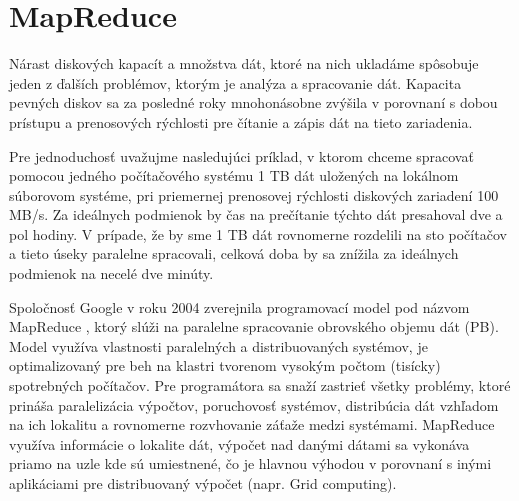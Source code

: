\documentclass[11pt,twoside,a4paper]{book}
\begin{document}

\section{MapReduce}

Nárast diskových kapacít a množstva dát, ktoré na nich ukladáme spôsobuje jeden z ďalších problémov, ktorým je analýza a spracovanie dát. Kapacita pevných diskov sa za posledné roky mnohonásobne zvýšila v porovnaní s dobou prístupu a prenosových rýchlosti pre čítanie a zápis dát na tieto zariadenia.

Pre jednoduchosť uvažujme nasledujúci príklad, v ktorom chceme spracovať pomocou jedného počítačového systému 1 TB dát uložených na lokálnom súborovom systéme, pri priemernej prenosovej rýchlosti diskových zariadení 100 MB/s. Za ideálnych podmienok by čas na prečítanie týchto dát presahoval dve a pol hodiny. V prípade, že by sme 1 TB dát rovnomerne rozdelili na sto počítačov a tieto úseky paralelne spracovali, celková doba by sa znížila za ideálnych podmienok na necelé dve minúty. 

Spoločnosť Google v roku 2004 zverejnila programovací model pod názvom MapReduce \cite{dean2008mapreduce}, ktorý slúži na paralelne spracovanie obrovského objemu dát (PB). Model využíva vlastnosti paralelných a distribuovaných systémov, je optimalizovaný pre beh na klastri tvorenom vysokým počtom (tisícky) spotrebných počítačov. Pre programátora sa snaží zastrieť všetky problémy, ktoré prináša paralelizácia výpočtov, poruchovosť systémov, distribúcia dát vzhľadom na ich lokalitu a rovnomerne rozvhovanie záťaže medzi systémami. MapReduce využíva informácie o lokalite dát, výpočet nad danými dátami sa vykonáva priamo na uzle kde sú umiestnené, čo je hlavnou výhodou v porovnaní s inými aplikáciami pre distribuovaný výpočet (napr. Grid computing). 
\end{document}
